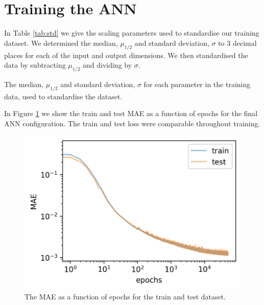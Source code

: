 \documentclass[a4paper,fleqn,usenatbib]{mnras}
\newcommand{\teff}{\ensuremath{T_\mathrm{eff}}}
\begin{document}

\section{Training the ANN}

In Table \ref{tab:std} we give the scaling parameters used to standardise our training dataset. We determined the median, $\mu_{1/2}$ and standard deviation, $\sigma$ to 3 decimal places for each of the input and output dimensions. We then standardised the data by subtracting $\mu_{1/2}$ and dividing by $\sigma$.

\begin{table}
    \caption{The median, $\mu_{1/2}$ and standard deviation, $\sigma$ for each parameter in the training data, used to standardise the dataset.}
    \label{tab:std}
    
\end{table}

In Figure \ref{fig:loss} we show the train and test MAE as a function of epochs for the final ANN configuration. The train and test loss were comparable throughout training.

\begin{figure}
    \centering
    \includegraphics[width=\linewidth]{figures/loss.png}
    \caption{The MAE as a function of epochs for the train and test dataset.}
    \label{fig:loss}
\end{figure}
\end{document}
